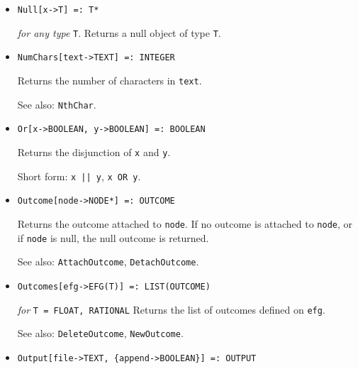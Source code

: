 \begin{itemize}
\item
\protect \large \begin{verbatim}
Null[x->T] =: T*
\end{verbatim}\normalsize

{\it for any type } {\tt T}.
\bd
Returns a null object of type \verb+T+.  
\ed

\item
\protect \large \begin{verbatim}
NumChars[text->TEXT] =: INTEGER
\end{verbatim}\normalsize

\bd
Returns the number of characters in \verb+text+.
\item [See also:] \verb+NthChar+.
\ed


\item 
\protect \large \begin{verbatim}
Or[x->BOOLEAN, y->BOOLEAN] =: BOOLEAN
\end{verbatim} \normalsize
  
\bd
Returns the disjunction of \verb+x+ and \verb+y+.
\item
[Short form:] \verb+x || y+, \verb+x OR y+.
\ed

\item
\protect \large \begin{verbatim}
Outcome[node->NODE*] =: OUTCOME
\end{verbatim}\normalsize

\bd
Returns the outcome attached to \verb+node+.  If no outcome is attached
to \verb+node+, or if \verb+node+ is null, the null outcome is returned.
\item [See also:] \verb+AttachOutcome+, \verb+DetachOutcome+.
\ed

\item
\protect \large \begin{verbatim}
Outcomes[efg->EFG(T)] =: LIST(OUTCOME)
\end{verbatim}\normalsize

{\it for} {\tt T = FLOAT, RATIONAL}
\bd
Returns the list of outcomes defined on \verb+efg+.
\item [See also:] \verb+DeleteOutcome+, \verb+NewOutcome+.
\ed

\item
\protect \large \begin{verbatim}
Output[file->TEXT, {append->BOOLEAN}] =: OUTPUT
\end{verbatim}\normalsize


\end{itemize}
